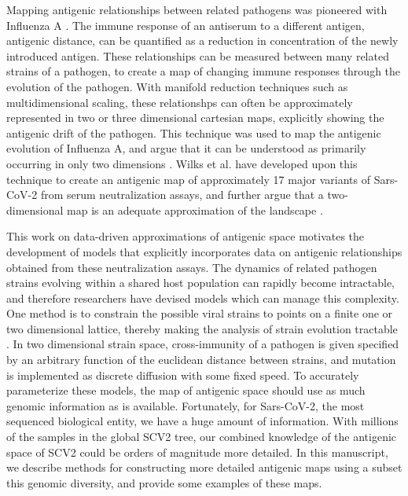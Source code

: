 \documentclass{article}
\begin{document}
Mapping antigenic relationships between related pathogens was pioneered with Influenza A \cite{lapedesGeometryShapeSpace2001}. 
The immune response of an antiserum to a different antigen, antigenic distance, can be quantified as a reduction in concentration of the newly introduced antigen.
These relationships can be measured between many related strains of a pathogen, to create a map of changing immune responses through the evolution of the pathogen.
With manifold reduction techniques such as multidimensional scaling, these relationshps can often be approximately represented in two or three dimensional cartesian maps, explicitly showing the antigenic drift of the pathogen.
This technique was used to map the antigenic evolution of Influenza A, and argue that it can be understood as primarily occurring in only two dimensions \cite{lapedesGeometryShapeSpace2001, smithMappingAntigenicGenetic2004}.
Wilks et al. have developed upon this technique to create an antigenic map of approximately 17 major variants of Sars-CoV-2 from serum neutralization assays, and further argue that a two-dimensional map is an adequate approximation of the landscape \cite{millerAntigenicSpaceFramework2021, wilksMappingSARSCoV2Antigenic2022, van2022mapping}. 

This work on data-driven approximations of antigenic space motivates the development of models that explicitly incorporates data on antigenic relationships obtained from these neutralization assays.
The dynamics of related pathogen strains evolving within a shared host population can rapidly become intractable, and therefore researchers have devised models which can manage this complexity.
One method is to constrain the possible viral strains to points on a finite one or two dimensional lattice, thereby making the analysis of strain evolution tractable \cite{gogDynamicsSelectionManystrain2002} . 
In two dimensional strain space, cross-immunity of a pathogen is given specified by an arbitrary function of the euclidean distance between strains, and mutation is implemented as discrete diffusion with some fixed speed. 
To accurately parameterize these models, the map of antigenic space should use as much genomic information as is available.
Fortunately, for Sars-CoV-2, the most sequenced biological entity, we have a huge amount of information. 
With millions of the samples in the global SCV2 tree, our combined knowledge of the antigenic space of SCV2 could be orders of magnitude more detailed.
In this manuscript, we describe methods for constructing more detailed antigenic maps using a subset this genomic diversity, and provide some examples of these maps.
\end{document}
